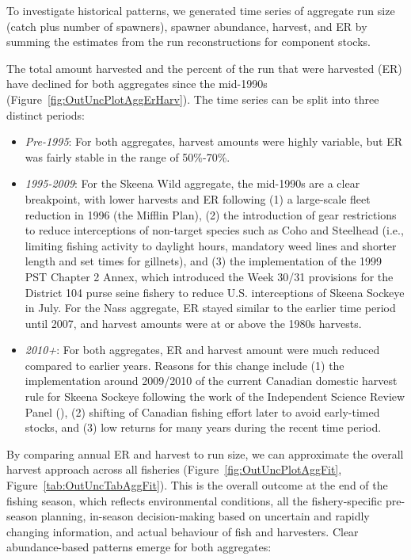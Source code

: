 \documentclass[french,11pt]{book}
\begin{document}
To investigate historical patterns, we generated time series of aggregate run size (catch plus number of spawners), spawner abundance, harvest, and ER by summing the estimates from the run reconstructions for component stocks.

The total amount harvested and the percent of the run that were harvested (ER) have declined for both aggregates since the mid-1990s (Figure~\ref{fig:OutUncPlotAggErHarv}). The time series can be split into three distinct periods:
\begin{itemize}

\item
  \emph{Pre-1995}: For both aggregates, harvest amounts were highly variable, but ER was fairly stable in the range of 50\%-70\%.
\item
  \emph{1995-2009}: For the Skeena Wild aggregate, the mid-1990s are a clear breakpoint, with lower harvests and ER following (1) a large-scale fleet reduction in 1996 (the Mifflin Plan), (2) the introduction of gear restrictions to reduce interceptions of non-target species such as Coho and Steelhead (i.e., limiting fishing activity to daylight hours, mandatory weed lines and shorter length and set times for gillnets), and (3) the implementation of the 1999 PST Chapter 2 Annex, which introduced the Week 30/31 provisions for the District 104 purse seine fishery to reduce U.S. interceptions of Skeena Sockeye in July. For the Nass aggregate, ER stayed similar to the earlier time period until 2007, and harvest amounts were at or above the 1980s harvests.
\item
  \emph{2010+}: For both aggregates, ER and harvest amount were much reduced compared to earlier years. Reasons for this change include (1) the implementation around 2009/2010 of the current Canadian domestic harvest rule for Skeena Sockeye following the work of the Independent Science Review Panel (), (2) shifting of Canadian fishing effort later to avoid early-timed stocks, and (3) low returns for many years during the recent time period.
\end{itemize}
By comparing annual ER and harvest to run size, we can approximate the overall harvest approach across all fisheries (Figure~\ref{fig:OutUncPlotAggFit}, Figure~\ref{tab:OutUncTabAggFit}). This is the overall outcome at the end of the fishing season, which reflects environmental conditions, all the fishery-specific pre-season planning, in-season decision-making based on uncertain and rapidly changing information, and actual behaviour of fish and harvesters. Clear abundance-based patterns emerge for both aggregates:
\end{document}
